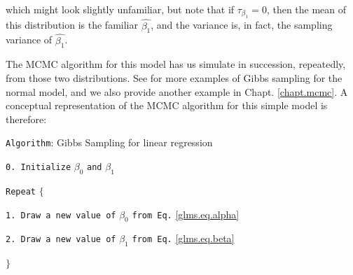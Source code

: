 which might look slightly unfamiliar, but note that if $\tau_{\beta_1} = 0$, 
then the mean of this distribution is the familiar $\hat{\beta_1}$, and
the variance is, in fact, the sampling variance of $\hat{\beta_1}$. 

The MCMC algorithm for this model has us simulate in succession,
repeatedly, from those two distributions. See \citet{gelman_etal:2004}
for more examples of Gibbs sampling for the normal model, and we also
provide another example in Chapt. \ref{chapt.mcmc}. A
conceptual representation of the MCMC algorithm for this simple model
is therefore:

\vspace{.1in}

\parbox[h]{6in}{
{\tt Algorithm}: Gibbs Sampling for linear regression

\vspace{.1in}

\hspace{.25in}
     {\tt  0. Initialize} $\beta_0$ {\tt and} $\beta_1$

\vspace{.1in}


\hspace{.25in}
     {\tt  Repeat} $\{$

\vspace{.1in}
   
\hspace{.45in}
        {\tt 1. Draw a new value of} $\beta_0$ {\tt from Eq.} \ref{glms.eq.alpha}

\vspace{.1in}

\hspace{.45in}
        {\tt 2. Draw a new value of} $\beta_1$  {\tt from Eq.} \ref{glms.eq.beta}

\vspace{.1in}

\hspace{.25in}
     $\}$
}

\vspace{.1in}

